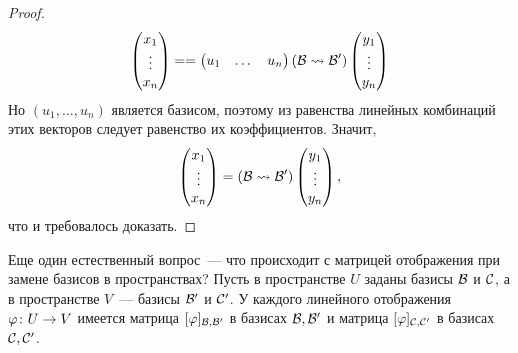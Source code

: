\begin{proof}
$$\begin{pmatrix}x_1 \\ \vdots \\ x_n\end{pmatrix} = 
=\begin{pmatrix}u_1 & \dots & u_n\end{pmatrix}
(\mathcal B\rightsquigarrow\mathcal B')
\begin{pmatrix}y_1 \\ \vdots \\ y_n\end{pmatrix}
$$
Но $(u_1,\dots,u_n)$ является базисом, поэтому из равенства линейных
комбинаций этих векторов следует равенство их коэффициентов.
Значит,
$$
\begin{pmatrix}x_1 \\ \vdots \\ x_n\end{pmatrix} = 
(\mathcal B\rightsquigarrow\mathcal B')
\begin{pmatrix}y_1 \\ \vdots \\ y_n\end{pmatrix},
$$
что и требовалось доказать.
\end{proof}




Еще один естественный вопрос~--- что происходит с матрицей отображения
при замене базисов в пространствах?
Пусть в пространстве $U$ заданы базисы $\mathcal B$ и $\mathcal C$, а в
пространстве $V$~--- базисы $\mathcal B'$ и $\mathcal C'$. У каждого линейного
отображения $\varphi\colon U\to V$ имеется матрица $[\varphi]_{\mathcal B,\mathcal B'}$
в базисах $\mathcal B,\mathcal B'$ и матрица $[\varphi]_{\mathcal C,\mathcal C'}$ в базисах
$\mathcal C,\mathcal C'$.

